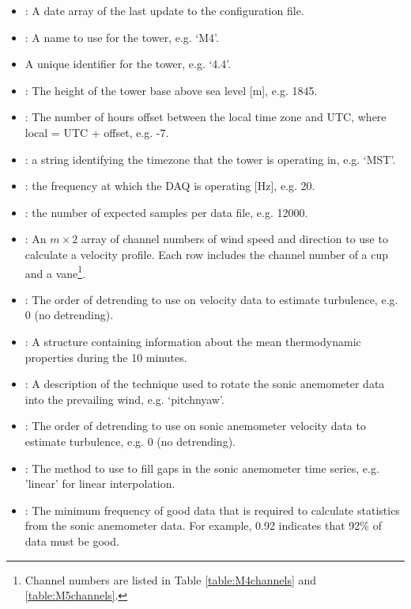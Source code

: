 \begin{itemize}
\item {}: A date array of the last update to the configuration file.
\item {}: A name to use for the tower, e.g. `M4'.
\item {} A unique identifier for the tower, e.g. `4.4'.
\item {}: The height of the tower base above sea level [m], e.g. 1845.
\item {}: The number of hours offset between the local time zone and UTC, where local = UTC + offset, e.g. -7.
\item {}: a string identifying the timezone that the tower is operating in, e.g. `MST'.
\item {}: the frequency at which the DAQ is operating [Hz], e.g. 20.
\item {}: the number of expected samples per data file, e.g. 12000.
\item {}: An $m\times 2$ array of channel numbers of wind speed and direction to use to calculate a velocity profile. Each row includes the channel number of a cup and a vane\footnote{Channel numbers are listed in Table \ref{table:M4channels} and \ref{table:M5channels}.}.
\item {}: The order of detrending to use on velocity data to estimate turbulence, e.g. 0 (no detrending).
\item {}: A structure containing information about the mean thermodynamic properties during the 10 minutes.
\item {}: A description of the technique used to rotate the sonic anemometer data into the prevailing wind, e.g. `pitchnyaw'.
\item {}:  The order of detrending to use on sonic anemometer velocity data to estimate turbulence, e.g. 0 (no detrending).
\item {}: The method to use to fill gaps in the sonic anemometer time series, e.g. 'linear' for linear interpolation.
\item {}: The minimum frequency of good data that is required to calculate statistics from the sonic anemometer data. For example, 0.92 indicates that 92\% of data must be good.

\end{itemize}
